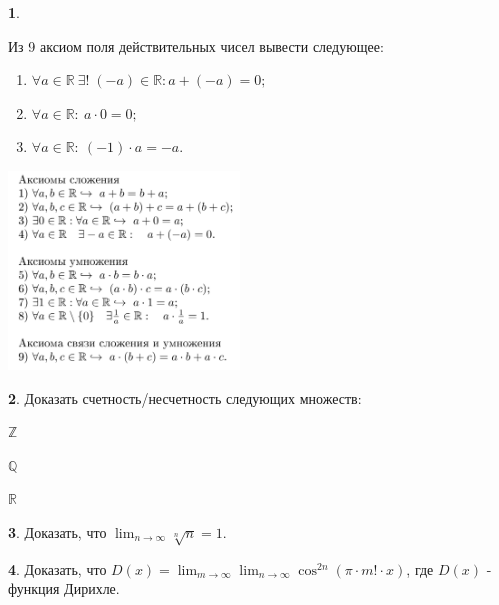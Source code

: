 \documentclass[14pt, a4paper]{extarticle}
\theoremstyle{definition}
\newtheorem{problem}{}
\theoremstyle{definition}
\theoremstyle{remark}
\numberwithin{equation}{section}
\newcommand{\Z}{\ensuremath{\mathbb{Z}}}
\newcommand{\Q}{\ensuremath{\mathbb{Q}}}
\newcommand{\R}{\ensuremath{\mathbb{R}}}
\begin{document}
\begin{problem}
    \begin{multicols}{2}
        Из 9 аксиом поля действительных чисел вывести следующее:
        \renewcommand{\labelenumi}{\alph{enumi})}
        \begin{enumerate}
        \item $\forall a \in \R \ \exists ! \; (-a)\in \R : a + (-a) = 0;$
        
        \item $\forall a \in \R : \ a \cdot 0 = 0;$
        
        \item $\forall a \in \R : \ (-1) \cdot a = -a.$
        \end{enumerate}

        \columnbreak

        \includegraphics[width=0.46\textwidth]{ax.jpeg}
      \end{multicols}
\end{problem}

\begin{problem}
    Доказать счетность/несчетность следующих множеств:
    \renewcommand{\labelenumi}{\alph{enumi})}
    \begin{enumerate*}[before=\hspace{1ex}, itemjoin=;\hspace*{3ex}]
        \item \Z
        \item \Q
        \item \R
    \end{enumerate*}
\end{problem}

\begin{problem}
    Доказать, что $\displaystyle\lim_{n\to\infty}{\sqrt[n]{n}} = 1.$
\end{problem}

\begin{problem}
    Доказать, что $D(x) = \displaystyle\lim_{m\to\infty}{\lim_{n\to\infty}
    {\cos^{2n}(\pi \cdot m! \cdot x)}}$, где $D(x)$ - функция Дирихле.
\end{problem}
\end{document}
